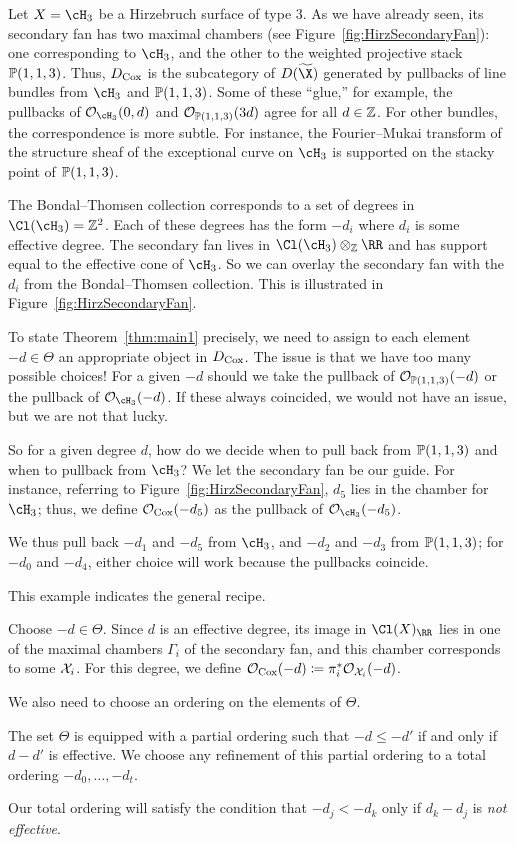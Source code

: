 \documentclass{amsart}
\begin{document}
\begin{example}\label{ex:hirzGKZ}
Let $X=\cH_3$ be a Hirzebruch surface of type $3$. As we have already seen, its secondary fan has two maximal chambers (see Figure~\ref{fig:HirzSecondaryFan}): one corresponding to $\cH_3$, and the other to the weighted projective stack $\mathbb P(1,1,3)$.
Thus, $D_{\operatorname{Cox}}$ is the subcategory of $D(\widetilde{\X})$ generated by pullbacks of line bundles from $\cH_3$ and $\mathbb P(1,1,3)$.
Some of these ``glue,'' for example, the pullbacks of $\cO_{\cH_3}(0,d)$ and ${\mathcal O}_{\mathbb P(1,1,3)}(3d)$ agree for all $d\in \mathbb Z$.  For other bundles, the correspondence is more subtle. For instance, the Fourier--Mukai transform of the structure sheaf of the exceptional curve on $\cH_3$ is supported on the stacky point of $\mathbb P(1,1,3)$.

The Bondal--Thomsen collection corresponds to a set of degrees in $\Cl(\cH_3)= \ZZ^2$.  Each of these degrees has the form $-d_i$ where $d_i$ is some effective degree.  The secondary fan lives in $\Cl(\cH_3)\otimes_{\ZZ} \RR$ and has support equal to the effective cone of $\cH_3$.  So we can overlay the secondary fan with the $d_i$ from the  Bondal--Thomsen collection.  This is illustrated in
Figure~\ref{fig:HirzSecondaryFan}.

To state Theorem~\ref{thm:main1} precisely, we need to assign to each element $-d\in \Theta$ an appropriate object in
$D_{\operatorname{Cox}}$. The issue is that we have too many possible choices!  For a given $-d$ should we take the pullback of ${\mathcal O}_{\mathbb P(1,1,3)}(-d)$ or the pullback of $\cO_{\cH_3}(-d)$.  If these always coincided, we would not have an issue, but we are not that lucky.

So for a given degree $d$, how do we decide when to pull back from $\mathbb P(1,1,3)$ and when to pullback from $\cH_3$?  We let the secondary fan be our guide.  For instance, referring to Figure~\ref{fig:HirzSecondaryFan},
$d_5$ lies in the chamber for $\cH_3$; thus, we define ${\mathcal O}_{\operatorname{Cox}}(-d_5)$ as
the pullback of $\cO_{\cH_3}(-d_5)$.

We thus pull back $-d_1$ and $-d_5$ from $\cH_3$, and $-d_2$ and $-d_3$ from $\mathbb P(1,1,3)$; for $-d_0$ and $-d_4$, either choice will work because the pullbacks coincide.
\end{example}
This example indicates the general recipe.
\begin{defn}\label{defn:ThetaCox}
Choose $-d \in \Theta$.  Since $d$ is an effective degree, its image in $\Cl(X)_\RR$ lies in one of the maximal chambers $\Gamma_i$ of the secondary fan, and this chamber corresponds to some $\mathcal X_i$.  For this degree, we define ${\mathcal O}_{\operatorname{Cox}}(-d)\coloneqq\pi_i^*{\mathcal O}_{\mathcal X_i}(-d)$.
\end{defn}
We also need to choose an ordering on the elements of $\Theta$.
\begin{defn}\label{defn:ordering}
   The set $\Theta$ is equipped with a partial ordering such that $-d \le -d'$ if and only if $d - d'$ is effective. We choose any refinement of this partial ordering to a total ordering $-d_0, \dots, -d_t$.
\end{defn}
Our total ordering will satisfy the condition that $-d_j < -d_k$ only if $d_k - d_j$ is {\em not effective}.  
\end{document}
